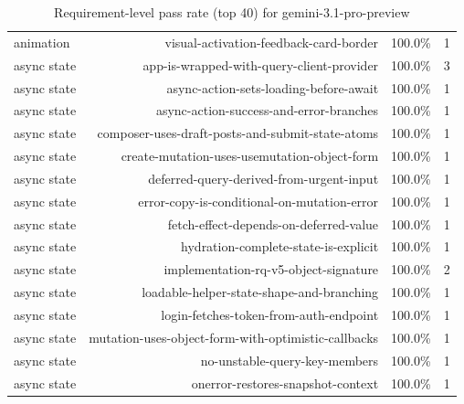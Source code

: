 \begin{table}[htbp]
\begin{tabular}{lrrr}
animation & visual-activation-feedback-card-border & 100.0\% & 1 \\
async state & app-is-wrapped-with-query-client-provider & 100.0\% & 3 \\
async state & async-action-sets-loading-before-await & 100.0\% & 1 \\
async state & async-action-success-and-error-branches & 100.0\% & 1 \\
async state & composer-uses-draft-posts-and-submit-state-atoms & 100.0\% & 1 \\
async state & create-mutation-uses-usemutation-object-form & 100.0\% & 1 \\
async state & deferred-query-derived-from-urgent-input & 100.0\% & 1 \\
async state & error-copy-is-conditional-on-mutation-error & 100.0\% & 1 \\
async state & fetch-effect-depends-on-deferred-value & 100.0\% & 1 \\
async state & hydration-complete-state-is-explicit & 100.0\% & 1 \\
async state & implementation-rq-v5-object-signature & 100.0\% & 2 \\
async state & loadable-helper-state-shape-and-branching & 100.0\% & 1 \\
async state & login-fetches-token-from-auth-endpoint & 100.0\% & 1 \\
async state & mutation-uses-object-form-with-optimistic-callbacks & 100.0\% & 1 \\
async state & no-unstable-query-key-members & 100.0\% & 1 \\
async state & onerror-restores-snapshot-context & 100.0\% & 1 \\
\bottomrule
\end{tabular}
\caption{Requirement-level pass rate (top 40) for gemini-3.1-pro-preview}
\end{table}
